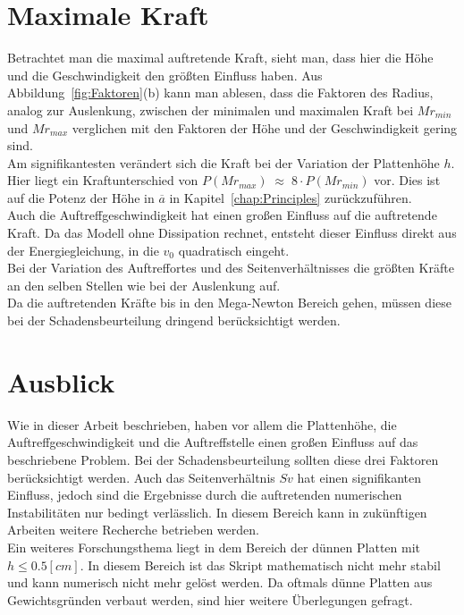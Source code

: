 \section{Maximale Kraft}
\label{sec:Kraft}

Betrachtet man die maximal auftretende Kraft, sieht man, dass hier die Höhe und die Geschwindigkeit den größten Einfluss haben. Aus Abbildung~\ref{fig:Faktoren}(b) kann man ablesen, dass die Faktoren des Radius, analog zur Auslenkung, zwischen der minimalen und maximalen Kraft bei $Mr_{min}$ und $Mr_{max}$ verglichen mit den Faktoren der Höhe und der Geschwindigkeit gering sind. \\
Am signifikantesten verändert sich die Kraft bei der Variation der Plattenhöhe $h$. Hier liegt ein Kraftunterschied von $P(Mr_{max}) \; \approx \; 8 \cdot P(Mr_{min})$ vor. Dies ist auf die Potenz der Höhe in $\overline{a}$ in Kapitel~\ref{chap:Principles} zurückzuführen. \\
Auch die Auftreffgeschwindigkeit hat einen großen Einfluss auf die auftretende Kraft. Da das Modell ohne Dissipation rechnet, entsteht dieser Einfluss direkt aus der Energiegleichung, in die $v_{0}$ quadratisch eingeht. \\
Bei der Variation des Auftreffortes und des Seitenverhältnisses die größten Kräfte an den selben Stellen wie bei der Auslenkung auf.\\
Da die auftretenden Kräfte bis in den Mega-Newton Bereich gehen, müssen diese bei der Schadensbeurteilung dringend berücksichtigt werden.

\section{Ausblick}
\label{sec:Ausblick}

Wie in dieser Arbeit beschrieben, haben vor allem die Plattenhöhe, die Auftreffgeschwindigkeit und die Auftreffstelle einen großen Einfluss auf das beschriebene Problem. Bei der Schadensbeurteilung sollten diese drei Faktoren berücksichtigt werden. Auch das Seitenverhältnis $Sv$ hat einen signifikanten Einfluss, jedoch sind die Ergebnisse durch die auftretenden numerischen Instabilitäten nur bedingt verlässlich. In diesem Bereich kann in zukünftigen Arbeiten weitere Recherche betrieben werden. \\
Ein weiteres Forschungsthema liegt in dem Bereich der dünnen Platten mit $h \leq 0.5 [cm]$. In diesem Bereich ist das Skript mathematisch nicht mehr stabil und kann numerisch nicht mehr gelöst werden. Da oftmals dünne Platten aus Gewichtsgründen verbaut werden, sind hier weitere Überlegungen gefragt. \\


